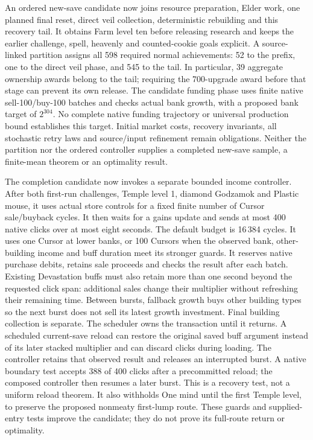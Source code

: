 \documentclass[11pt,a4paper]{article}
\numberwithin{equation}{section}
\theoremstyle{definition}
\theoremstyle{remark}
\begin{document}
An ordered new-save candidate now joins resource preparation, Elder work, one planned final reset, direct veil collection, deterministic rebuilding and this recovery tail. It obtains Farm level ten before releasing research and keeps the earlier challenge, spell, heavenly and counted-cookie goals explicit. A source-linked partition assigns all 598 required normal achievements: 52 to the prefix, one to the direct veil phase, and 545 to the tail. In particular, 39 aggregate ownership awards belong to the tail; requiring the 700-upgrade award before that stage can prevent its own release. The candidate funding phase uses finite native sell-100/buy-100 batches and checks actual bank growth, with a proposed bank target of $2^{304}$. No complete native funding trajectory or universal production bound establishes this target. Initial market costs, recovery invariants, all stochastic retry laws and source/input refinement remain obligations. Neither the partition nor the ordered controller supplies a completed new-save sample, a finite-mean theorem or an optimality result.

The completion candidate now invokes a separate bounded income controller. After both first-run challenges, Temple level 1, diamond Godzamok and Plastic mouse, it uses actual store controls for a fixed finite number of Cursor sale/buyback cycles. It then waits for a gains update and sends at most 400 native clicks over at most eight seconds. The default budget is 16\,384 cycles. It uses one Cursor at lower banks, or 100 Cursors when the observed bank, other-building income and buff duration meet its stronger guards. It reserves native purchase debits, retains sale proceeds and checks the result after each batch. Existing Devastation buffs must also retain more than one second beyond the requested click span: additional sales change their multiplier without refreshing their remaining time. Between bursts, fallback growth buys other building types so the next burst does not sell its latest growth investment. Final building collection is separate. The scheduler owns the transaction until it returns. A scheduled current-save reload can restore the original saved buff argument instead of its later stacked multiplier and can discard clicks during loading. The controller retains that observed result and releases an interrupted burst. A native boundary test accepts 388 of 400 clicks after a precommitted reload; the composed controller then resumes a later burst. This is a recovery test, not a uniform reload theorem. It also withholds One mind until the first Temple level, to preserve the proposed nonmeaty first-lump route. These guards and supplied-entry tests improve the candidate; they do not prove its full-route return or optimality.
\end{document}
